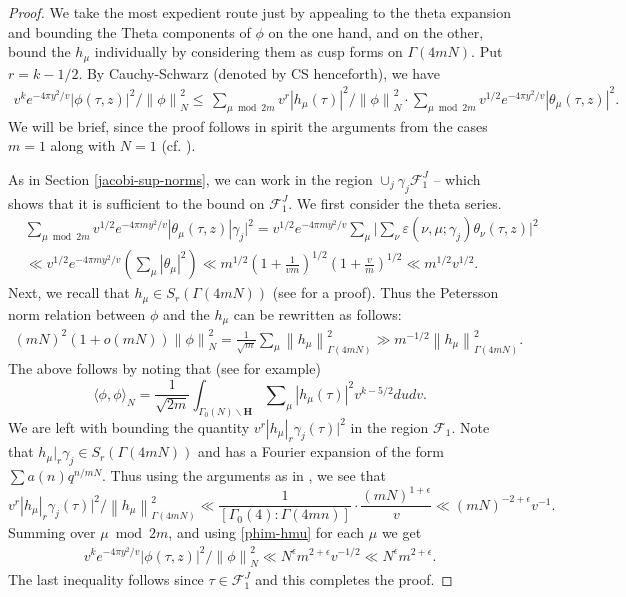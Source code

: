 \documentclass[11pt]{amsart}
\numberwithin{equation}{section}
\theoremstyle{plain}
\theoremstyle{definition}
\newcommand{\h}{\mf H}
\newcommand{\mf}{\mathbf}
\newcommand{\mc}{\mathcal}
\newcommand*{\norm}[1]{\left\lVert#1\right\rVert}
\newcommand{\lan}{\langle }
\newcommand{\ran}{\rangle}
\newcommand{\sumn}{\sum \nolimits}
\begin{document}
\begin{proof}
We take the most expedient route just by appealing to the theta expansion and bounding the Theta components of $\phi$ on the one hand, and on the other, bound the $h_\mu$ individually by considering them as cusp forms on $\Gamma(4mN)$. Put $r=k-1/2$. By Cauchy-Schwarz (denoted by CS henceforth), we have
\begin{align} \label{phi-adhoc}
    v^{k} e^{- 4 \pi y^2/v}|\phi(\tau,z) |^2/\norm{\phi}^2_N  \le  \, \sum_{\mu \bmod {2m}} v^r |h_\mu (\tau)|^2 /\norm{\phi}^2_N \cdot \sum_{\mu \bmod {2m}} v^{1/2} e^{- 4 \pi y^2/v} |\theta_\mu(\tau,z)|^2.
\end{align}
We will be brief, since the proof follows in spirit the arguments from the cases $m=1$ along with $N=1$ (cf. \cite{PASD}).

As in Section \ref{jacobi-sup-norms}, we can work in the region $\cup_j \gamma_j \mc F^J_1$ -- which shows that it is sufficient to the bound on $\mc F^J_1$. We first consider the theta series.
\begin{align}
    &\sumn_{\mu \bmod {2m}} v^{1/2} e^{- 4 \pi m y^2/v}  |\theta_\mu(\tau,z)|\gamma_j |^2  = v^{1/2} e^{- 4 \pi m y^2/v} \sumn_\mu \Big|\sumn_\nu \varepsilon(\nu, \mu; \gamma_j)\theta_\nu(\tau,z) \Big|^2\\
    & \ll v^{1/2} e^{- 4 \pi m y^2/v}\left(\sumn_\mu |\theta_\mu|^2 \right)\ll  m^{1/2} (1+ \frac{1}{vm})^{1/2}(1+ \frac{v}{m})^{1/2}  \ll m^{1/2}v^{1/2}.
\end{align}
Next, we recall that $h_\mu\in S_r(\Gamma(4mN))$ (see \cite[Section~4, Part~B]{boche-das} for a proof). Thus the Petersson norm relation between $\phi$ and the $h_\mu$ can be rewritten as follows:
\begin{align} \label{phim-hmu}
    (mN)^{2}(1 + o(mN) ) \norm{\phi}^2_N = \frac{1}{\sqrt{m}}\sumn_\mu \norm{h_\mu}_{\Gamma(4mN)}^2\gg m^{-1/2} \norm{h_\mu}_{\Gamma(4mN)}^2.
\end{align}
The above follows by noting that (see \cite[Thm.5.3]{EZ} for example)
\begin{equation}
    \lan \phi, \phi\ran_N=\frac{1}{\sqrt{2m}}\int_{\Gamma_0(N)\backslash\h}\sumn_{\mu} |h_\mu(\tau)|^2 v^{k-5/2}du dv.
\end{equation}
We are left with bounding the quantity $v^r |h_\mu |_r \gamma_j (\tau)|^2$ in the region $\mc F_1$. Note that $h_\mu |_r \gamma_j \in S_r(\Gamma(4mN))$ and has a Fourier expansion of the form $\sum a(n) q^{n/mN}$. Thus using the arguments as in \cite[Proposition 3.1]{Kir}, we see that
\begin{equation}
    v^r |h_\mu |_r \gamma_j (\tau)|^2/\norm{h_\mu}_{\Gamma(4mN)}^2 \ll \frac{1}{[\Gamma_0(4):\Gamma(4mn)]}\cdot \frac{(mN)^{1+\epsilon}}{v}\ll (mN)^{-2+\epsilon}v^{-1}.
\end{equation}
Summing over $\mu \bmod{2m}$, and using \eqref{phim-hmu} for each $\mu$ we get
\begin{align}
    v^{k} e^{- 4 \pi y^2/v}|\phi(\tau,z) |^2/\norm{\phi}^2_N\ll N^{\epsilon} m^{2+\epsilon} v^{-1/2}\ll N^{\epsilon} m^{2+\epsilon}.
\end{align}
The last inequality follows since $\tau\in \mc F_1^J$ and this completes the proof.
\end{proof}
\end{document}
